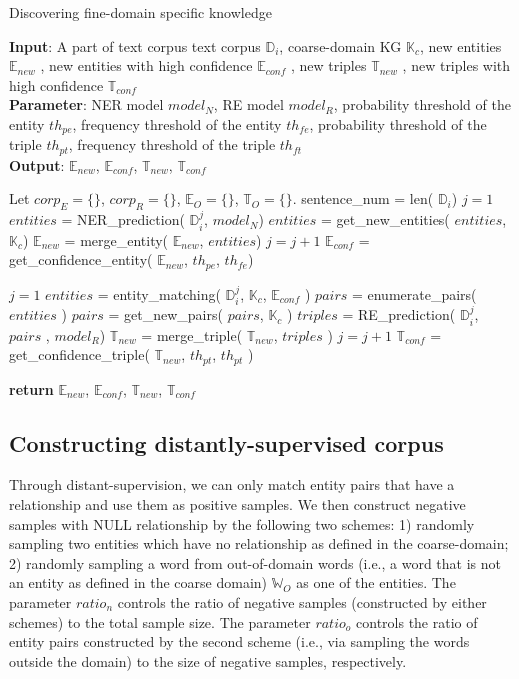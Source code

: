 \documentclass[sigconf]{acmart}
\begin{document}
\begin{algorithm}[tb]
	\caption{Discovering fine-domain specific knowledge}
	\label{alg:algorithm3}
	\textbf{Input}: A part of text corpus text corpus $\mathbb{D}_i$, coarse-domain KG $\mathbb{K}_c$,   new entities  $\mathbb{E}_{new}$ , new entities  with high confidence $\mathbb{E}_{conf}$ , new triples  $\mathbb{T}_{new}$ , new triples  with high confidence $\mathbb{T}_{conf}$ \\
	\textbf{Parameter}: NER model $model_N$, RE model $model_R$, probability threshold of the entity $th_{pe}$, frequency threshold of the entity $th_{fe}$, probability threshold of the triple $th_{pt}$, frequency threshold of the triple $th_{ft}$ \\
	\textbf{Output}: $\mathbb{E}_{new}$, $\mathbb{E}_{conf}$, $\mathbb{T}_{new}$, $\mathbb{T}_{conf}$
	\begin{algorithmic}[1] %
		\STATE Let $corp_E=\{\}$, $corp_R=\{\}$, $\mathbb{E}_O=\{\}$, $\mathbb{T}_O=\{\}$.
		\STATE sentence\_num = len( $\mathbb{D}_i$)
		\STATE $j = 1$
		\STATE $entities$ = NER\_prediction( $\mathbb{D}_i^{j}$, $model_N$)
		\STATE $entities$ = get\_new\_entities( $entities$, $\mathbb{K}_c$)
		\STATE $\mathbb{E}_{new}$ = merge\_entity( $\mathbb{E}_{new}$, $entities$)
		\STATE $j = j + 1$
		\ENDWHILE
		\STATE $\mathbb{E}_{conf}$ = get\_confidence\_entity( $\mathbb{E}_{new}$, $th_{pe}$, $th_{fe}$)
		
		\STATE $j = 1$
		\STATE $entities$ = entity\_matching( $\mathbb{D}_i^{j}$, $\mathbb{K}_c$, $\mathbb{E}_{conf}$ )
		\STATE $pairs$ = enumerate\_pairs( $entities$ )
		\STATE $pairs$ = get\_new\_pairs( $pairs$, $\mathbb{K}_c$ )
		\STATE $triples$ = RE\_prediction( $\mathbb{D}_i^{j}$, $pairs$ , $model_R$)
		\STATE $\mathbb{T}_{new}$ = merge\_triple( $\mathbb{T}_{new}$, $triples$ )
		\STATE $j = j + 1$
		\ENDWHILE
		\STATE $\mathbb{T}_{conf}$ = get\_confidence\_triple( $\mathbb{T}_{new}$, $th_{pt}$, $th_{pt}$ )
		
		\STATE \textbf{return} $\mathbb{E}_{new}$, $\mathbb{E}_{conf}$, $\mathbb{T}_{new}$, $\mathbb{T}_{conf}$
	\end{algorithmic}
\end{algorithm}


\subsection{Constructing distantly-supervised corpus}
Through distant-supervision, we can only match entity pairs that have a relationship and use them as positive samples. We then construct negative samples with NULL relationship by the following two schemes: 1) randomly sampling two entities which have no relationship as defined in the coarse-domain; 2) randomly sampling a word from out-of-domain words (i.e., a word that is not an entity as defined in the coarse domain) $\mathbb{W}_O$ as one of the entities. The parameter ${ratio_n}$ controls the ratio of negative samples (constructed by either schemes) to the total sample size. The parameter ${ratio_o}$ controls the ratio of entity pairs constructed by the second scheme (i.e., via sampling the words outside the domain) to the size of negative samples, respectively. 
\end{document}
